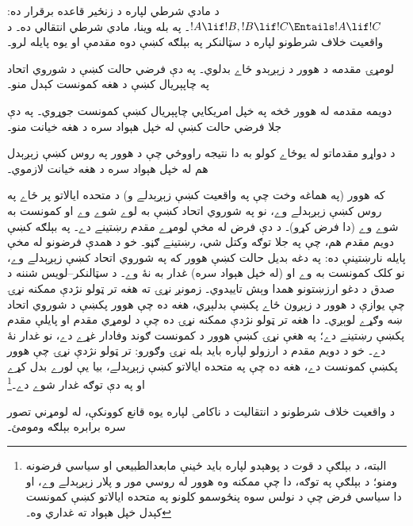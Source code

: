\documentclass[../../../include/open-logic-section]{subfiles}
\begin{document}


د مادي شرطي لپاره د زنځير قاعده برقرار ده: $!A \lif !B, !B
\lif !C \Entails !A \lif !C$۔ په بله وينا، مادي شرطي انتقالي
ده۔ د واقعيت خلاف شرطونو لپاره د سټالنکر په بېلګه کښې دوه مقدمې او يوه پايله لرو۔
\begin{explain}
  لومړۍ مقدمه د هوور د زېږېدو ځاے بدلوي۔ په دې فرضي حالت
  کښې د شوروي اتحاد په چاپېريال کښې د هغه کمونست کېدل منو۔

  دويمه مقدمه له هوور څخه په خپل امريکايي چاپېريال کښې
  کمونست جوړوي۔ په دې جلا فرضي حالت کښې له خپل هېواد سره د
  هغه خيانت منو۔

  د دواړو مقدماتو له يوځاے کولو به دا نتيجه راووځي چې د
  هوور په روس کښې زېږېدل هم له خپل هېواد سره د هغه خيانت
  لازموي۔
\end{explain}
که هوور (په هماغه وخت چې په واقعيت کښې زېږېدلے و) د
متحده ايالاتو پر ځاے په روس کښې زېږېدلے وے، نو په شوروي
اتحاد کښې به لوے شوے وے او کمونست به شوے وے (دا فرض کړو)۔
د دې فرض له مخې لومړے مقدم رښتينے دے۔ په بېلګه کښې
دويم مقدم هم، چې په جلا توګه وکتل شي، رښتينے ګڼو۔ خو
د همدې فرضونو له مخې پايله نارښتينې ده: په دغه بديل حالت کښې
هوور که په شوروي اتحاد کښې زېږېدلے وے، نو کلک کمونست به وے
او (له خپل هېواد سره) غدار به نۀ وے۔ د سټالنکر--لويس شننه
د صدق د دغو ارزښتونو همدا وېش تاييدوي۔ زمونږ نړۍ ته هغه تر ټولو
نژدې ممکنه نړۍ چې يوازې د هوور د زېږون ځاے پکښې بدلېږي، هغه
ده چې هوور پکښې د شوروي اتحاد ښه وګړے لوېږي۔ دا هغه تر
ټولو نژدې ممکنه نړۍ ده چې د لومړي مقدم او پايلې مقدم پکښې
رښتينے دے؛ په هغې نړۍ کښې هوور د کمونست ګوند وفادار غړے
دے، نو غدار نۀ دے۔ خو د دويم مقدم د ارزولو لپاره بايد بله
نړۍ وګورو: تر ټولو نژدې نړۍ چې هوور پکښې کمونست دے، هغه
ده چې په متحده ايالاتو کښې زېږېدلے، بيا يې لورے بدل کړے او
په دې توګه غدار شوے دے۔\footnote{البته، د بېلګې د قوت د
  پوهېدو لپاره بايد ځينې مابعدالطبيعي او سياسي فرضونه ومنو؛
  د بېلګې په توګه، دا چې ممکنه وه هوور له روسي مور و پلار
  زېږېدلے وے، او دا سياسي فرض چې د نولس سوه پنځوسمو کلونو
  په متحده ايالاتو کښې کمونست کېدل خپل هېواد ته غداري وه۔}

\begin{prob}
  د واقعيت خلاف شرطونو د انتقاليت د ناکامۍ لپاره يوه
  قانع کوونکې، له لومړني تصور سره برابره بېلګه ومومئ۔
\end{prob}
\end{document}
